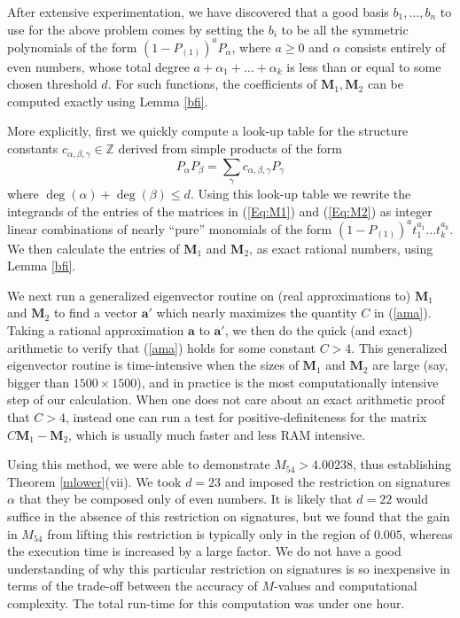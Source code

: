 \documentclass{bmcart}
\theoremstyle{plain}
\theoremstyle{definition}
\newcommand\Z{\mathbb{Z}}
\begin{document}
After extensive experimentation, we have discovered that a good basis $b_1,\dots,b_n$ to use for the above problem comes by setting the $b_i$ to be all the symmetric polynomials of the form $(1-P_{(1)})^a P_\alpha$, where $a \geq 0$ and $\alpha$ consists entirely of even numbers, whose total degree $a + \alpha_1+\dots +\alpha_k$ is less than or equal to some chosen threshold $d$.  For such functions, the coefficients of $\mathbf{M}_1,\mathbf{M}_2$ can be computed exactly using Lemma \ref{bfi}.

More explicitly, first we quickly compute a look-up table for the structure constants $c_{\alpha,\beta,\gamma}\in \Z$ derived from simple products of the form
\[
P_{\alpha}P_{\beta}=\sum_{\gamma}c_{\alpha,\beta,\gamma}P_{\gamma}
\]
where $\deg(\alpha)+\deg(\beta)\leq d$.  Using this look-up table we rewrite the integrands of the entries of the matrices in (\ref{Eq:M1}) and (\ref{Eq:M2}) as integer linear combinations of nearly ``pure'' monomials of the form $(1-P_{(1)})^a t_1^{a_1}\dots t_k^{a_k}$.  We then calculate the entries of $\mathbf{M}_1$ and $\mathbf{M}_2$, as exact rational numbers, using Lemma \ref{bfi}.

We next run a generalized eigenvector routine on (real approximations to) $\mathbf{M}_1$ and $\mathbf{M}_2$ to find a vector $\mathbf{a}'$ which nearly maximizes the quantity $C$ in (\ref{ama}).  Taking a rational approximation $\mathbf{a}$ to $\mathbf{a}'$, we then do the quick (and exact) arithmetic to verify that (\ref{ama}) holds for some constant $C>4$.  This generalized eigenvector routine is time-intensive when the sizes of $\mathbf{M}_1$ and $\mathbf{M}_2$ are large (say, bigger than $1500\times 1500$), and in practice  is the most computationally intensive step of our calculation.  When one does not care about an exact arithmetic proof that $C>4$, instead one can run a test for positive-definiteness for the matrix $C\mathbf{M}_1-\mathbf{M}_2$, which is usually much faster and less RAM intensive.

Using this method, we were able to demonstrate $M_{54} > 4.00238$, thus establishing Theorem \ref{mlower}(vii).  We took $d=23$ and imposed the restriction on signatures $\alpha$ that they be composed only of even numbers. It is likely that $d=22$ would suffice in the absence of this restriction on signatures, but we found that the gain in $M_{54}$ from lifting this restriction is typically only in the region of $0.005$, whereas the execution time is increased by a large factor. We do not have a good understanding of why this particular restriction on signatures is so inexpensive in terms of the trade-off between the accuracy of $M$-values and computational complexity.  The total run-time for this computation was under one hour.
\end{document}
